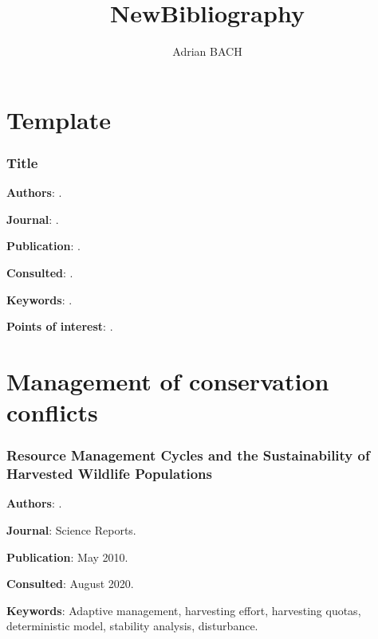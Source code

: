\documentclass[12pt,a4paper]{article}
\author{Adrian BACH}
\title{NewBibliography}
\begin{document}
\section*{Template}

\subsubsection*{Title}

\textbf{Authors}: \cite{}.

\textbf{Journal}: .

\textbf{Publication}: .

\textbf{Consulted}: .

\textbf{Keywords}: .

\textbf{Points of interest}: .

\newpage

\section*{Management of conservation conflicts}

\subsubsection*{Resource Management Cycles and the Sustainability of Harvested Wildlife Populations}

\textbf{Authors}: \cite{fryxell2010resource}.

\textbf{Journal}: Science Reports.

\textbf{Publication}: May 2010.

\textbf{Consulted}: August 2020.

\textbf{Keywords}: Adaptive management, harvesting effort, harvesting quotas, deterministic model, stability analysis, disturbance.
\end{document}
